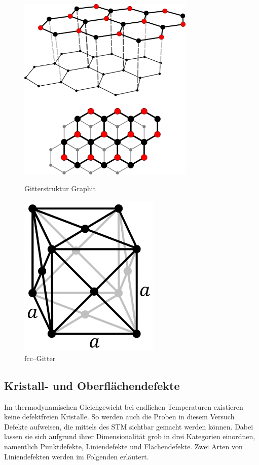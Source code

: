 \documentclass[12pt,a4paper]{scrartcl}
\numberwithin{equation}{section} %
\begin{document}
\begin{figure}[ht]
	\begin{minipage}[b]{0.5\textwidth}
		\centering
		\includegraphics[width=0.75\textwidth]{../media/B2.5/Graphit_gitter4.png}
		\caption{Gitterstruktur Graphit \cite{WikipediaGraphit}}
	\end{minipage}
	\begin{minipage}[b]{0.5\textwidth}
		\centering
		\includegraphics[width=0.6\textwidth]{../media/B2.5/412px-Cubic-face-centered.svg.png}
		\caption{fcc--Gitter \cite{WikipediaFcc}}
		\label{abb:fcc}
	\end{minipage}
\end{figure}

\hypertarget{defekte}{
\subsection{Kristall- und Oberflächendefekte}\label{defekte}}
Im thermodynamischen Gleichgewicht bei endlichen Temperaturen existieren keine defektfreien Kristalle. So werden auch die Proben in diesem Versuch Defekte aufweisen, die mittels des STM sichtbar gemacht werden können. Dabei lassen sie sich aufgrund ihrer Dimensionalität grob in drei Kategorien einordnen, namentlich Punktdefekte, Liniendefekte und Flächendefekte. Zwei Arten von Liniendefekten werden im Folgenden erläutert.
\end{document}
